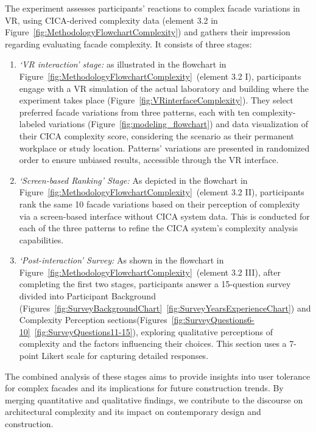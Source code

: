%    

The experiment assesses participants' reactions to complex facade variations in VR, using CICA-derived complexity data (element 3.2 in Figure~\ref{fig:MethodologyFlowchartComplexity}) and gathers their impression regarding evaluating facade complexity.
It consists of three stages:

\begin{enumerate}
    \item \textit{`VR interaction' stage:}  as illustrated in the flowchart in Figure~\ref{fig:MethodologyFlowchartComplexity}~(element 3.2 I), participants engage with a VR simulation of the actual laboratory and building where the experiment takes place (Figure~\ref{fig:VRinterfaceComplexity}). They select preferred facade variations from three patterns, each with ten complexity-labeled variations (Figure~\ref{fig:modeling_flowchart}) and data visualization of their CICA complexity score, considering the scenario as their permanent workplace or study location.
    Patterns' variations are presented in randomized order to ensure unbiased results, accessible through the VR interface.

    \item \textit{`Screen-based Ranking' Stage:} As depicted in the flowchart in Figure~\ref{fig:MethodologyFlowchartComplexity}~(element 3.2 II), participants rank the same 10 facade variations based on their perception of complexity via a screen-based interface without CICA system data.
    This is conducted for each of the three patterns to refine the CICA system's complexity analysis capabilities.

    \item \textit{`Post-interaction' Survey:} As shown in the flowchart in Figure~\ref{fig:MethodologyFlowchartComplexity}~(element 3.2 III), after completing the first two stages, participants answer a 15-question survey divided into Participant Background (Figures~\ref{fig:SurveyBackgroundChart}~\ref{fig:SurveyYearsExperienceChart}) and Complexity Perception sections(Figures~\ref{fig:SurveyQuestions6-10}~\ref{fig:SurveyQuestions11-15}), exploring qualitative perceptions of complexity and the factors influencing their choices.
    This section uses a 7-point Likert scale for capturing detailed responses.
\end{enumerate}


The combined analysis of these stages aims to provide insights into user tolerance for complex facades and its implications for future construction trends.
By merging quantitative and qualitative findings, we contribute to the discourse on architectural complexity and its impact on contemporary design and construction.